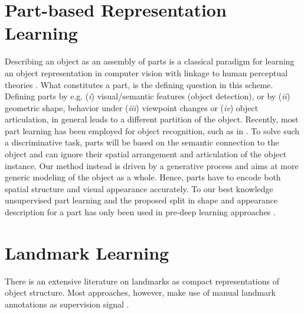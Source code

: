 \section{Part-based Representation Learning}
	Describing an object as an assembly of parts is a classical paradigm for learning an object representation in computer vision \cite{Ross:2006uc} with linkage to human perceptual theories \cite{Biederman:1987tc}.
	What constitutes a part, is the defining question in this scheme.
	Defining parts by e.g. (\emph{i}) visual/semantic features (object detection), or by (\emph{ii}) geometric shape, behavior under (\emph{iii}) viewpoint changes or (\emph{iv}) object articulation, in general leads to a different partition of the object.
	Recently, most part learning has been employed for object recognition, such as in \cite{Felzenszwalb:2010ve, Novotny:2017ta, Singh:2012un, Mesnil:2013hi, Yang:2016uo, Lam:2017ta}.
	To solve such a discriminative task, parts will be based on the semantic connection to the object and can ignore their spatial arrangement and articulation of the object instance. Our method instead is driven by a generative process and aims at more generic modeling of the object as a whole. Hence, parts have to encode both spatial structure and visual appearance accurately. To our best knowledge unsupervised part learning and the proposed split in shape and appearance description for a part has only been used in pre-deep learning approaches \cite{Ross:2006uc, Nguyen:2013vk, Cootes:1998tn}.


\section{Landmark Learning}
	There is an extensive literature on landmarks as compact representations of object structure.
	Most approaches, however, make use of manual landmark annotations as supervision signal \cite{Wu:2017vc, Ranjan:2016vv, Yu:2016vi, Zhang:2016vx, Zhu:2015tz, Zhang:2014wy, Pedersoli:2014ta, Ionescu:2011ue, Toshev:2014tp, Pfister:2015uo, Wei:2016ws, Newell:2016vq, Lim:2018uo, Cao:2017vv}.

